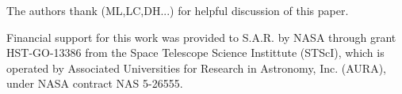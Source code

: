 
\begin{acknowledgments}
The authors thank (ML,LC,DH...) for helpful discussion of this paper.

Financial support for this work was provided to S.A.R. by NASA through
grant HST-GO-13386 from the Space Telescope Science Instittute
(STScI), which is operated by Associated Universities for Research in
Astronomy, Inc. (AURA), under NASA contract NAS
5-26555.
\end{acknowledgments}
